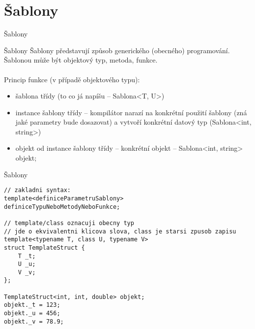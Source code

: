 \section{Šablony}

\begin{frame}
\begin{block}{} 
\begin{center}
\Huge
Šablony
\end{center}
\end{block}
\end{frame}



\begin{frame}[fragile]
\begin{block}{Šablony} 
Šablony představují způsob generického (obecného) programování. Šablonou může být objektový typ, metoda, funkce.
\\~\\
Princip funkce (v případě objektového typu):
\begin{itemize}
\item šablona třídy (to co já napíšu -- Sablona<T, U>)
\item instance šablony třídy -- kompilátor narazí na konkrétní použití šablony (zná jaké parametry bude dosazovat) a vytvoří konkrétní datový typ (Sablona<int, string>)
\item objekt od instance šablony třídy -- konkrétní objekt -- Sablona<int, string> objekt;
\end{itemize}
\end{block}
\end{frame}



\begin{frame}[fragile]
\begin{exampleblock}{Šablony} 
\begin{lstlisting}
// zakladni syntax:
template<definiceParametruSablony>
definiceTypuNeboMetodyNeboFunkce;

// template/class oznacuji obecny typ
// jde o ekvivalentni klicova slova, class je starsi zpusob zapisu
template<typename T, class U, typename V>
struct TemplateStruct {
	T _t;
	U _u;
	V _v;
};

TemplateStruct<int, int, double> objekt;
objekt._t = 123;
objekt._u = 456;
objekt._v = 78.9;
\end{lstlisting}
\end{exampleblock}
\end{frame}

